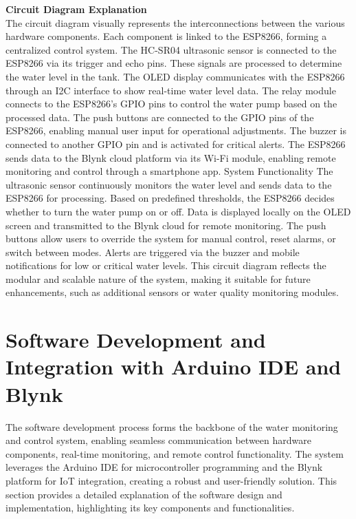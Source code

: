 {\noindent
\textbf{Circuit Diagram Explanation}\\
The circuit diagram visually represents the interconnections between the various hardware components. Each component is linked to the ESP8266, forming a centralized control system.
\noindent
The HC-SR04 ultrasonic sensor is connected to the ESP8266 via its trigger and echo pins. These signals are processed to determine the water level in the tank.
The OLED display communicates with the ESP8266 through an I2C interface to show real-time water level data.
The relay module connects to the ESP8266’s GPIO pins to control the water pump based on the processed data.
The push buttons are connected to the GPIO pins of the ESP8266, enabling manual user input for operational adjustments.
The buzzer is connected to another GPIO pin and is activated for critical alerts.
The ESP8266 sends data to the Blynk cloud platform via its Wi-Fi module, enabling remote monitoring and control through a smartphone app.
System Functionality
The ultrasonic sensor continuously monitors the water level and sends data to the ESP8266 for processing.
Based on predefined thresholds, the ESP8266 decides whether to turn the water pump on or off.
Data is displayed locally on the OLED screen and transmitted to the Blynk cloud for remote monitoring.
The push buttons allow users to override the system for manual control, reset alarms, or switch between modes.
Alerts are triggered via the buzzer and mobile notifications for low or critical water levels.
This circuit diagram reflects the modular and scalable nature of the system, making it suitable for future enhancements, such as additional sensors or water quality monitoring modules.

\section{Software Development and Integration with Arduino IDE and Blynk}
The software development process forms the backbone of the water monitoring and control system, enabling seamless communication between hardware components, real-time monitoring, and remote control functionality. The system leverages the Arduino IDE for microcontroller programming and the Blynk platform for IoT integration, creating a robust and user-friendly solution. This section provides a detailed explanation of the software design and implementation, highlighting its key components and functionalities.\\

}
